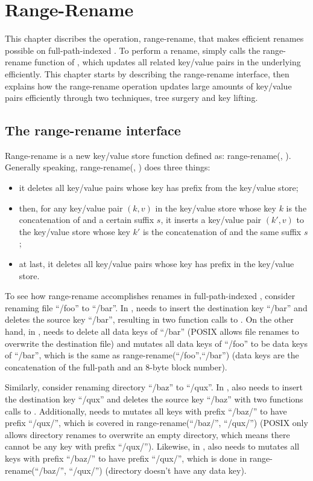 \chapter{Range-Rename}
\label{chap:rename}

This chapter discribes the \bet operation, range-rename, that makes efficient
renames possible on full-path-indexed \betrfs.
To perform a rename, \betrfs simply calls the range-rename function of \fti,
which updates all related key/value pairs in the underlying \bets efficiently.
This chapter starts by describing the range-rename interface,
then explains how the range-rename operation updates large amounts of key/value
pairs efficiently through two techniques, tree surgery and key lifting.

\section{The range-rename interface}

Range-rename is a new key/value store function defined as:
range-rename(\spre, \dpre).
Generally speaking, range-rename(\spre, \dpre) does three things:
\begin{itemize}
\item it deletes all key/value pairs whose key has prefix \dpre from the
key/value store;
\item then, for any key/value pair $(k,v)$ in the key/value store whose key $k$
is the concatenation of \spre and a certain suffix $s$, it inserts a key/value
pair $(k',v)$ to the key/value store whose key $k'$ is the concatenation of
\dpre and the same suffix $s$;
\item at last, it deletes all key/value pairs whose key has prefix \spre in the
key/value store.
\end{itemize}

To see how range-rename accomplishes renames in full-path-indexed \betrfs,
consider renaming file ``/foo'' to ``/bar''.
In \mdb, \betrfs needs to insert the destination key ``/bar'' and deletes the
source key ``/bar'', resulting in two function calls to \fti.
On the other hand, in \ddb, \betrfs needs to delete all data keys of ``/bar''
(POSIX allows file renames to overwrite the destination file) and mutates all
data keys of ``/foo'' to be data keys of ``/bar'', which is the same as
range-rename(``/foo'',``/bar'') (data keys are the concatenation of the
full-path and an 8-byte block number).

Similarly, consider renaming directory ``/baz'' to ``/qux''.
In \mdb, \betrfs also needs to insert the destination key ``/qux'' and deletes
the source key ``/baz'' with two functions calls to \fti.
Additionally, \betrfs needs to mutates all keys with prefix ``/baz/'' to have
prefix ``/qux/'', which is covered in range-rename(``/baz/'', ``/qux/'')
(POSIX only allows directory renames to overwrite an empty directory, which
means there cannot be any key with prefix ``/qux/'').
Likewise, in \mdb, \betrfs also needs to mutates all keys with prefix ``/baz/''
to have prefix ``/qux/'', which is done in range-rename(``/baz/'', ``/qux/'')
(directory doesn't have any data key).

